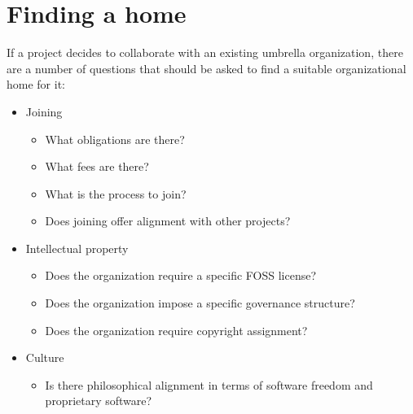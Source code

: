 


\chapter{Finding a home}

If a project decides to collaborate with an existing umbrella organization, there are a number of questions that should be asked to find a suitable organizational home for it:

\begin{itemize}

\item Joining

\begin{itemize}

\item What obligations are there?

\item What fees are there?

\item What is the process to join?

\item Does joining offer alignment with other projects?

\end{itemize}

\item Intellectual property

\begin{itemize}

\item Does the organization require a specific FOSS license?

\item Does the organization impose a specific governance structure?

\item Does the organization require copyright assignment?

\end{itemize}

\item Culture

\begin{itemize}

\item Is there philosophical alignment in terms of software freedom and proprietary software?


\end{itemize}
\end{itemize}
